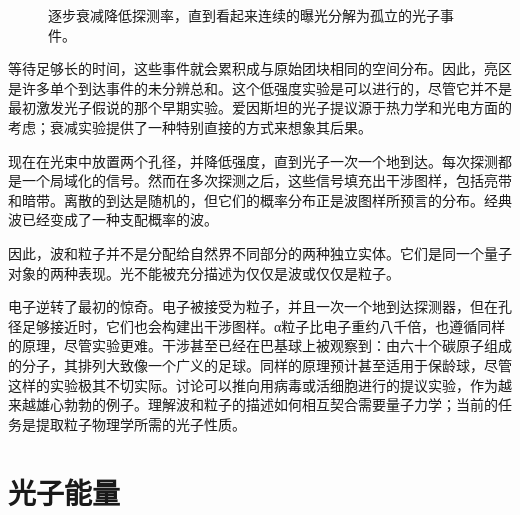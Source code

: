 \begin{figure}[h]
\centering
{}
\caption{逐步衰减降低探测率，直到看起来连续的曝光分解为孤立的光子事件。}
\end{figure}

等待足够长的时间，这些事件就会累积成与原始团块相同的空间分布。因此，亮区是许多单个到达事件的未分辨总和。这个低强度实验是可以进行的，尽管它并不是最初激发光子假说的那个早期实验。爱因斯坦的光子提议源于热力学和光电方面的考虑；衰减实验提供了一种特别直接的方式来想象其后果。

现在在光束中放置两个孔径，并降低强度，直到光子一次一个地到达。每次探测都是一个局域化的信号。然而在多次探测之后，这些信号填充出干涉图样，包括亮带和暗带。离散的到达是随机的，但它们的概率分布正是波图样所预言的分布。经典波已经变成了一种支配概率的波。

因此，波和粒子并不是分配给自然界不同部分的两种独立实体。它们是同一个量子对象的两种表现。光不能被充分描述为仅仅是波或仅仅是粒子。

电子逆转了最初的惊奇。电子被接受为粒子，并且一次一个地到达探测器，但在孔径足够接近时，它们也会构建出干涉图样。{\proseunicodefont α}粒子比电子重约八千倍，也遵循同样的原理，尽管实验更难。干涉甚至已经在巴基球上被观察到：由六十个碳原子组成的分子，其排列大致像一个广义的足球。同样的原理预计甚至适用于保龄球，尽管这样的实验极其不切实际。讨论可以推向用病毒或活细胞进行的提议实验，作为越来越雄心勃勃的例子。理解波和粒子的描述如何相互契合需要量子力学；当前的任务是提取粒子物理学所需的光子性质。

\section{光子能量}

